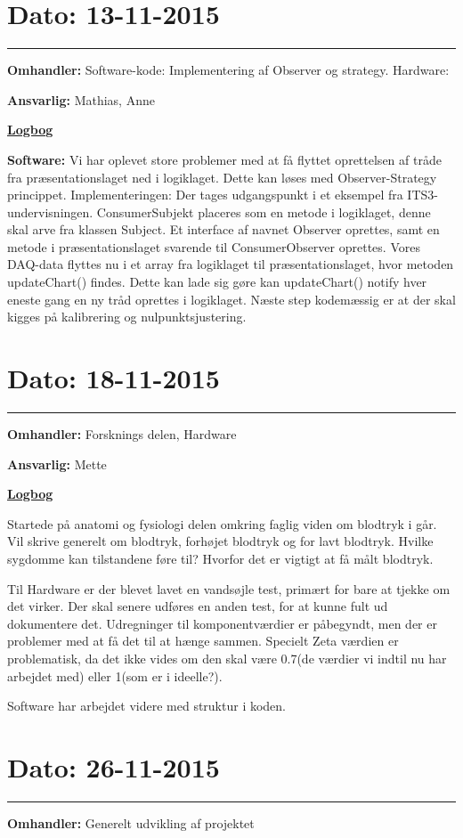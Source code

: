 \newpage
\section{Dato: 13-11-2015}
\hrule
\textbf{Omhandler:} Software-kode: Implementering af Observer og strategy. Hardware:  

\textbf{Ansvarlig:} Mathias, Anne

\underline{\textbf{Logbog}}

\textbf{Software: }Vi har oplevet store problemer med at få flyttet oprettelsen af tråde fra præsentationslaget ned i logiklaget. Dette kan løses med Observer-Strategy princippet. 
Implementeringen: Der tages udgangspunkt i et eksempel fra ITS3-undervisningen. ConsumerSubjekt placeres som en metode i logiklaget, denne skal arve fra klassen Subject. Et interface af navnet Observer oprettes, samt en metode i præsentationslaget svarende til ConsumerObserver oprettes. Vores DAQ-data flyttes nu i et array fra logiklaget til præsentationslaget, hvor metoden updateChart() findes. Dette kan lade sig gøre kan updateChart() notify hver eneste gang en ny tråd oprettes i logiklaget. 
Næste step kodemæssig er at der skal kigges på kalibrering og nulpunktsjustering.

\section{Dato: 18-11-2015}
\hrule
\textbf{Omhandler:} Forsknings delen, Hardware

\textbf{Ansvarlig:} Mette

\underline{\textbf{Logbog}}

Startede på anatomi og fysiologi delen omkring faglig viden om blodtryk i går. Vil skrive generelt om blodtryk, forhøjet blodtryk og for lavt blodtryk. Hvilke sygdomme kan tilstandene føre til? Hvorfor det er vigtigt at få målt blodtryk. 

Til Hardware er der blevet lavet en vandsøjle test, primært for bare at tjekke om det virker. Der skal senere udføres en anden test, for at kunne fult ud dokumentere det. 
Udregninger til komponentværdier er påbegyndt, men der er problemer med at få det til at hænge sammen. Specielt Zeta værdien er problematisk, da det ikke vides om den skal være 0.7(de værdier vi indtil nu har arbejdet med) eller 1(som er i ideelle?). 

Software har arbejdet videre med struktur i koden.  
\\
\section{Dato: 26-11-2015}
\hrule
\textbf{Omhandler:} Generelt udvikling af projektet

